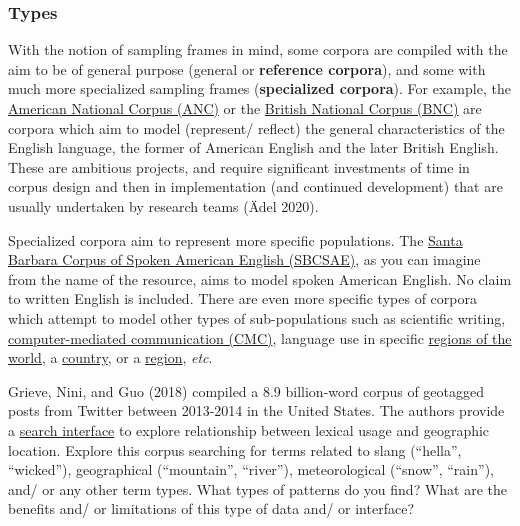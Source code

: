 \documentclass[
  letterpaper,
]{latex/krantz}
\begin{document}
\hypertarget{types}{%
\subsubsection{Types}\label{types}}

With the notion of sampling frames in mind, some corpora are compiled
with the aim to be of general purpose (general or \textbf{reference
corpora}), and some with much more specialized sampling frames
(\textbf{specialized corpora}). For example, the
\href{https://www.anc.org/}{American National Corpus (ANC)} or the
\href{http://www.natcorp.ox.ac.uk/}{British National Corpus (BNC)} are
corpora which aim to model (represent/ reflect) the general
characteristics of the English language, the former of American English
and the later British English. These are ambitious projects, and require
significant investments of time in corpus design and then in
implementation (and continued development) that are usually undertaken
by research teams (Ädel 2020).

Specialized corpora aim to represent more specific populations. The
\href{https://www.linguistics.ucsb.edu/research/santa-barbara-corpus}{Santa
Barbara Corpus of Spoken American English (SBCSAE)}, as you can imagine
from the name of the resource, aims to model spoken American English. No
claim to written English is included. There are even more specific types
of corpora which attempt to model other types of sub-populations such as
scientific writing,
\href{https://www.clarin.eu/resource-families/cmc-corpora}{computer-mediated
communication (CMC)}, language use in specific
\href{http://ice-corpora.net/ice/index.html}{regions of the world}, a
\href{https://cesa.arizona.edu}{country}, or a
\href{https://cesa.arizona.edu}{region}, \emph{etc}.

\begin{tcolorbox}[enhanced jigsaw, toprule=.15mm, bottomtitle=1mm, coltitle=black, title=\textcolor{quarto-callout-important-color}{\faExclamation}\hspace{0.5em}{Consider}, left=2mm, colframe=quarto-callout-important-color-frame, bottomrule=.15mm, colbacktitle=quarto-callout-important-color!10!white, leftrule=.75mm, colback=white, titlerule=0mm, breakable, toptitle=1mm, opacityback=0, arc=.35mm, rightrule=.15mm, opacitybacktitle=0.6]

Grieve, Nini, and Guo (2018) compiled a 8.9 billion-word corpus of
geotagged posts from Twitter between 2013-2014 in the United States. The
authors provide a \href{https://isogloss.shinyapps.io/isogloss/}{search
interface} to explore relationship between lexical usage and geographic
location. Explore this corpus searching for terms related to slang
(``hella'', ``wicked''), geographical (``mountain'', ``river''),
meteorological (``snow'', ``rain''), and/ or any other term types. What
types of patterns do you find? What are the benefits and/ or limitations
of this type of data and/ or interface?

\end{tcolorbox}
\end{document}
